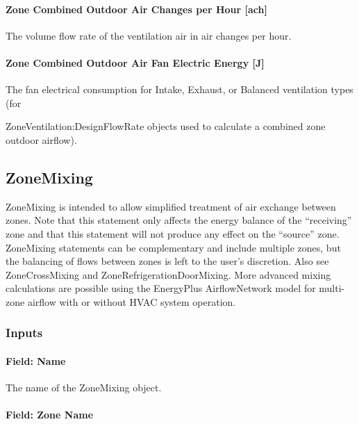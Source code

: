 \paragraph{Zone Combined Outdoor Air Changes per Hour {[}ach{]}}\label{zone-combined-outdoor-air-changes-per-hour-ach}

The volume flow rate of the ventilation air in air changes per hour.

\paragraph{Zone Combined Outdoor Air Fan Electric Energy {[}J{]}}\label{zone-combined-outdoor-air-fan-electric-energy-j}

The fan electrical consumption for Intake, Exhaust, or Balanced ventilation types (for

ZoneVentilation:DesignFlowRate objects used to calculate a combined zone outdoor airflow).

\subsection{ZoneMixing}\label{zonemixing}

ZoneMixing is intended to allow simplified treatment of air exchange between zones. Note that this statement only affects the energy balance of the ``receiving'' zone and that this statement will not produce any effect on the ``source'' zone. ZoneMixing statements can be complementary and include multiple zones, but the balancing of flows between zones is left to the user's discretion. Also see ZoneCrossMixing and ZoneRefrigerationDoorMixing. More advanced mixing calculations are possible using the EnergyPlus AirflowNetwork model for multi-zone airflow with or without HVAC system operation.

\subsubsection{Inputs}\label{inputs-5-004}

\paragraph{Field: Name}\label{field-name-5-004}

The name of the ZoneMixing object.

\paragraph{Field: Zone Name}\label{field-zone-name-3}

